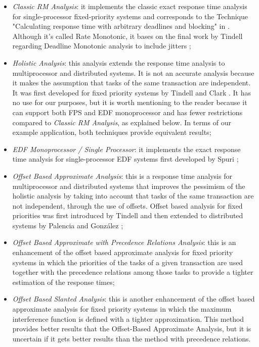 \documentclass{article}
\begin{document}
\begin{itemize}
   \item \textit{Classic RM Analysis}: it implements the classic exact response time analysis for single-processor fixed-priority systems and corresponds to the Technique "Calculating response time with arbitrary deadlines and blocking" in \cite{practitioner}. Although it's called Rate Monotonic, it bases on the final work by Tindell regarding Deadline Monotonic analysis to include jitters \cite{tindell-dm};
   \item \textit{Holistic Analysis}: this analysis extends the response time analysis to multiprocessor and distributed systems. It is not an accurate analysis because it makes the assumption that tasks of the same transaction are independent. It was first developed for fixed priority systems by Tindell and Clark \cite{holistic-analysis}. It has no use for our purposes, but it is worth mentioning to the reader because it can support both FPS and EDF monoprocessor and has fewer restrictions compared to \textit{Classic RM Analysis}, as explained below. In terms of our example application, both techniques provide equivalent results;
   \item \textit{EDF Monoprocessor / Single Processor}: it implements the exact response time analysis for single-processor EDF systems first developed by Spuri \cite{spuri};
   \item \textit{Offset Based Approximate Analysis}: this is a response time analysis for multiprocessor and distributed systems that improves the pessimism of the holistic analysis by taking into account that tasks of the same transaction are not independent, through the use of offsets. Offset based analysis for fixed priorities was first introduced by Tindell \cite{tindell-offsets} and then extended to distributed systems by Palencia and González \cite{pessimistic-rma};
   \item \textit{Offset Based Approximate with Precedence Relations Analysis}: this is an enhancement of the offset based approximate analysis for fixed priority systems in which the priorities of the tasks of a given transaction are used together with the precedence relations among those tasks to provide a tighter estimation of the response times;
   \item \textit{Offset Based Slanted Analysis}: this is another enhancement of the offset based approximate analysis for fixed priority systems in which the maximum interference function is defined with a tighter approximation. This method provides better results that the Offset-Based Approximate Analysis, but it is uncertain if it gets better results than the method with precedence relations.
\end{itemize}
\end{document}
